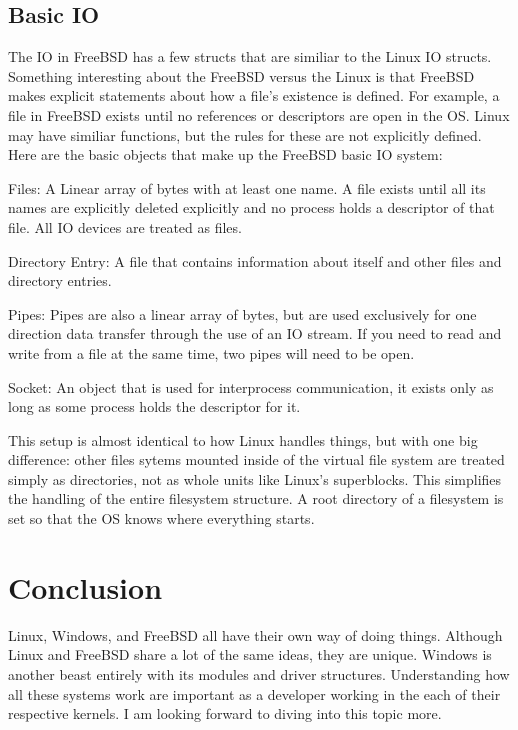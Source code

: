 \documentclass[10pt,letterpaper,onecolumn,draftclsnofoot]{IEEEtran}
\begin{document}
 \subsection{Basic IO}
 The IO in FreeBSD has a few structs that are similiar to the Linux IO structs.
 Something interesting about the FreeBSD versus the Linux is that FreeBSD
 makes explicit statements about how a file's existence is defined. For example,
 a file in FreeBSD exists until no references or descriptors are open in the OS.
 Linux may have similiar functions, but the rules for these are not explicitly
 defined. Here are the basic objects that make up the FreeBSD basic IO system:
 \cite{freebsd2016}
 \begin{description}
   \item Files: A Linear array of bytes with at least one name. A file exists
   until all its names are explicitly deleted explicitly and no process holds a
   descriptor of that file. All IO devices are treated as files.
   \item Directory Entry: A file that contains information about itself and
   other files and directory entries.
   \item Pipes: Pipes are also a linear array of bytes, but are used exclusively
   for one direction data transfer through the use of an IO stream. If you need
   to read and write from a file at the same time, two pipes will need to be open.
   \item Socket: An object that is used for interprocess communication, it exists
   only as long as some process holds the descriptor for it.
 \end{description}

 This setup is almost identical to how Linux handles things, but with one big
 difference: other files sytems mounted inside of the virtual file system are treated simply
 as directories, not as whole units like Linux's superblocks. This simplifies
 the handling of the entire filesystem structure. A root directory of a filesystem
 is set so that the OS knows where everything starts.

 \section{Conclusion}
Linux, Windows, and FreeBSD all have their own way of doing things. Although Linux
and FreeBSD share a lot of the same ideas, they are unique. Windows is another beast
entirely with its modules and driver structures. Understanding how all these systems
work are important as a developer working in the each of their respective kernels.
I am looking forward to diving into this topic more.
\end{document}
